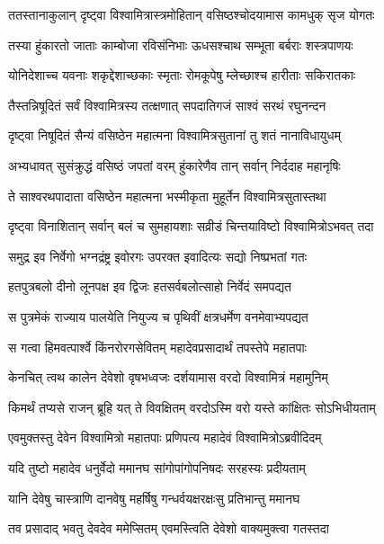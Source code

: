 
\twolineshloka
{ततस्तानाकुलान् दृष्ट्वा विश्वामित्रास्त्रमोहितान्}
{वसिष्ठश्चोदयामास कामधुक् सृज योगतः} %

\twolineshloka
{तस्या हुंकारतो जाताः काम्बोजा रविसंनिभाः}
{ऊधसश्चाथ सम्भूता बर्बराः शस्त्रपाणयः} %

\twolineshloka
{योनिदेशाच्च यवनाः शकृद्देशाच्छकाः स्मृताः}
{रोमकूपेषु म्लेच्छाश्च हारीताः सकिरातकाः} %

\twolineshloka
{तैस्तन्निषूदितं सर्वं विश्वामित्रस्य तत्क्षणात्}
{सपदातिगजं साश्वं सरथं रघुनन्दन} %

\twolineshloka
{दृष्ट्वा निषूदितं सैन्यं वसिष्ठेन महात्मना}
{विश्वामित्रसुतानां तु शतं नानाविधायुधम्} %

\twolineshloka
{अभ्यधावत् सुसंक्रुद्धं वसिष्ठं जपतां वरम्}
{हुंकारेणैव तान् सर्वान् निर्ददाह महानृषिः} %

\twolineshloka
{ते साश्वरथपादाता वसिष्ठेन महात्मना}
{भस्मीकृता मुहूर्तेन विश्वामित्रसुतास्तथा} %

\twolineshloka
{दृष्ट्वा विनाशितान् सर्वान् बलं च सुमहायशाः}
{सव्रीडं चिन्तयाविष्टो विश्वामित्रोऽभवत् तदा} %

\twolineshloka
{समुद्र इव निर्वेगो भग्नद्रंष्ट्र इवोरगः}
{उपरक्त इवादित्यः सद्यो निष्प्रभतां गतः} %

\twolineshloka
{हतपुत्रबलो दीनो लूनपक्ष इव द्विजः}
{हतसर्वबलोत्साहो निर्वेदं समपद्यत} %

\twolineshloka
{स पुत्रमेकं राज्याय पालयेति नियुज्य च}
{पृथिवीं क्षत्रधर्मेण वनमेवाभ्यपद्यत} %

\twolineshloka
{स गत्वा हिमवत्पार्श्वे किंनरोरगसेवितम्}
{महादेवप्रसादार्थं तपस्तेपे महातपाः} %

\twolineshloka
{केनचित् त्वथ कालेन देवेशो वृषभध्वजः}
{दर्शयामास वरदो विश्वामित्रं महामुनिम्} %

\twolineshloka
{किमर्थं तप्यसे राजन् ब्रूहि यत् ते विवक्षितम्}
{वरदोऽस्मि वरो यस्ते कांक्षितः सोऽभिधीयताम्} %

\twolineshloka
{एवमुक्तस्तु देवेन विश्वामित्रो महातपाः}
{प्रणिपत्य महादेवं विश्वामित्रोऽब्रवीदिदम्} %

\twolineshloka
{यदि तुष्टो महादेव धनुर्वेदो ममानघ}
{सांगोपांगोपनिषदः सरहस्यः प्रदीयताम्} %

\twolineshloka
{यानि देवेषु चास्त्राणि दानवेषु महर्षिषु}
{गन्धर्वयक्षरक्षःसु प्रतिभान्तु ममानघ} %

\twolineshloka
{तव प्रसादाद् भवतु देवदेव ममेप्सितम्}
{एवमस्त्विति देवेशो वाक्यमुक्त्वा गतस्तदा} %

